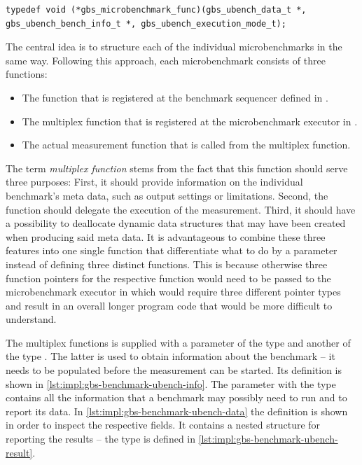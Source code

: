 \begin{lstlisting}[style=cpp,captionpos={b},caption={Definition of the function pointer for the multiplex functions.},label=lst:impl:gbs-benchmark-microbenchmark-func]
typedef void (*gbs_microbenchmark_func)(gbs_ubench_data_t *, gbs_ubench_bench_info_t *, gbs_ubench_execution_mode_t);
\end{lstlisting}

The central idea is to structure each of the individual microbenchmarks in the same way. Following this approach, each microbenchmark consists of three functions:
\begin{itemize}
	\item The function that is registered at the benchmark sequencer defined in .
	\item The multiplex function that is registered at the microbenchmark executor in .
	\item The actual measurement function that is called from the multiplex function.
\end{itemize}

The term \emph{multiplex function} stems from the fact that this function should serve three purposes: First, it should provide information on the individual benchmark's meta data, such as output settings or limitations. Second, the function should delegate the execution of the measurement. Third, it should have a possibility to deallocate dynamic data structures that may have been created when producing said meta data. It is advantageous to combine these three features into one single function that differentiate what to do by a parameter instead of defining three distinct functions. This is because otherwise three function pointers for the respective function would need to be passed to the microbenchmark executor in  which would require three different pointer types and result in an overall longer program code that would be more difficult to understand.

The multiplex functions is supplied with a parameter of the type \ubenchData and another of the type \ubenchInfo. The latter is used to obtain information about the benchmark -- it needs to be populated before the measurement can be started. Its definition is shown in \autoref{lst:impl:gbs-benchmark-ubench-info}. The parameter with the type \ubenchData contains all the information that a benchmark may possibly need to run and to report its data. In \autoref{lst:impl:gbs-benchmark-ubench-data} the definition is shown in order to inspect the respective fields. It contains a nested structure for reporting the results -- the type \ubenchResult is defined in \autoref{lst:impl:gbs-benchmark-ubench-result}.

